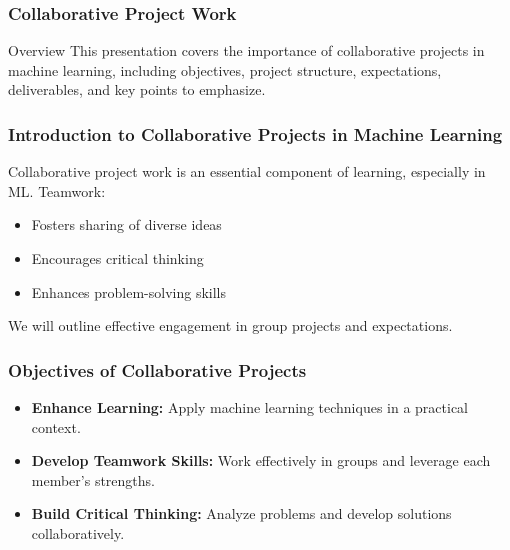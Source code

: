 \documentclass[aspectratio=169]{beamer}
\begin{document}
\begin{frame}
    \frametitle{Collaborative Project Work}
    \begin{block}{Overview}
        This presentation covers the importance of collaborative projects in machine learning, including objectives, project structure, expectations, deliverables, and key points to emphasize.
    \end{block}
\end{frame}

\begin{frame}
    \frametitle{Introduction to Collaborative Projects in Machine Learning}
    Collaborative project work is an essential component of learning, especially in ML. Teamwork:
    \begin{itemize}
        \item Fosters sharing of diverse ideas
        \item Encourages critical thinking
        \item Enhances problem-solving skills
    \end{itemize}
    We will outline effective engagement in group projects and expectations.
\end{frame}

\begin{frame}
    \frametitle{Objectives of Collaborative Projects}
    \begin{itemize}
        \item \textbf{Enhance Learning:} Apply machine learning techniques in a practical context.
        \item \textbf{Develop Teamwork Skills:} Work effectively in groups and leverage each member's strengths.
        \item \textbf{Build Critical Thinking:} Analyze problems and develop solutions collaboratively.
    \end{itemize}
\end{frame}
\end{document}
